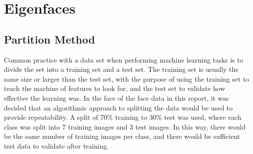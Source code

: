 \documentclass[a4paper, 10pt, conference]{ieeeconf}
\begin{document}
\section{Eigenfaces}

\subsection{Partition Method}

Common practice with a data set when performing machine learning tasks is to divide the set into a training set and a test set. The training set is usually the same size or larger than the test set, with the purpose of using the training set to teach the machine of features to look for, and the test set to validate how effective the learning was. In the face of the face data in this report, it was decided that an algorithmic approach to splitting the data would be used to provide repeatability. A split of 70\% training to 30\% test was used, where each class was split into 7 training images and 3 test images. In this way, there would be the same number of training images per class, and there would be sufficient test data to validate after training.


\end{document}
